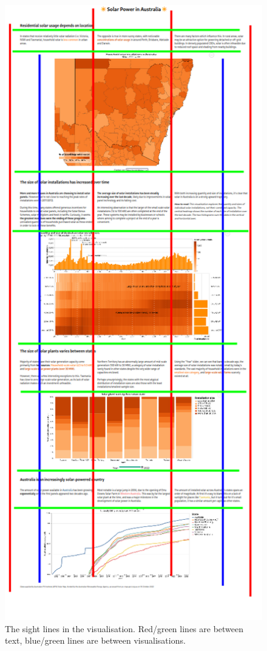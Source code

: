 \documentclass[12pt,letterpaper]{article}
\begin{document}
\begin{multicols}{2}
    \begin{figure}[H]
        \centering
        \includegraphics[width=0.9\linewidth]{images/sight.png}
        \caption{The sight lines in the visualisation. Red/green lines are between text, blue/green lines are between visualisations.}
        \label{fig:sight}
    \end{figure}


\end{multicols}
\end{document}
